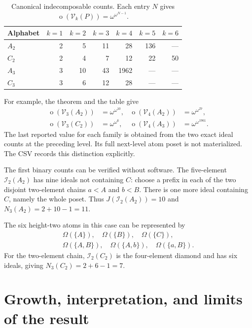 \documentclass[11pt,a4paper]{article}
\numberwithin{equation}{section}
\theoremstyle{definition}
\theoremstyle{remark}
\newcommand{\mot}{\mathop{o}}
\newcommand{\Vheight}{\mathcal V}
\newcommand{\I}{\mathcal I}
\begin{document}
\begin{table}[ht]
\centering
\renewcommand{\arraystretch}{1.2}
\begin{tabular}{@{}lrrrrrr@{}}
\toprule
Alphabet & $k=1$ & $k=2$ & $k=3$ & $k=4$ & $k=5$ & $k=6$\\
\midrule
$A_2$ & 2 & 5 & 11 & 28 & 136 & ---\\
$C_2$ & 2 & 4 & 7 & 12 & 22 & 50\\
$A_3$ & 3 & 10 & 43 & 1962 & --- & ---\\
$C_3$ & 3 & 6 & 12 & 28 & --- & ---\\
\bottomrule
\end{tabular}
\caption{Canonical indecomposable counts. Each entry $N$ gives
$\mot(\Vheight_k(P))=\omega^{\omega^{N-1}}$.}
\label{height:tab:counts}
\end{table}

For example, the theorem and the table give
\[
\begin{aligned}
  \mot(\Vheight_3(A_2))&=\omega^{\omega^{10}}, &
  \mot(\Vheight_4(A_2))&=\omega^{\omega^{27}},\\
  \mot(\Vheight_3(C_2))&=\omega^{\omega^6}, &
  \mot(\Vheight_4(A_3))&=\omega^{\omega^{1961}}.
\end{aligned}
\]
The last reported value for each family is obtained from the two exact
ideal counts at the preceding level. Its full next-level atom poset is
not materialized. The CSV records this distinction explicitly.

The first binary counts can be verified without software. The five-element
$\I_2(A_2)$ has nine ideals not containing $C$: choose a prefix in each of
the two disjoint two-element chains $a<A$ and $b<B$. There is one more
ideal containing $C$, namely the whole poset. Thus $J(\I_2(A_2))=10$
and $N_3(A_2)=2+10-1=11$.

The six height-two atoms in this case can be represented by
\[
\begin{gathered}
  \Omega(\{A\}),\quad \Omega(\{B\}),\quad \Omega(\{C\}),\\
  \Omega(\{A,B\}),\quad \Omega(\{A,b\}),\quad \Omega(\{a,B\}).
\end{gathered}
\]
For the two-element chain, $\I_2(C_2)$ is the four-element diamond and
has six ideals, giving $N_3(C_2)=2+6-1=7$.

\section{Growth, interpretation, and limits of the result}\label{height:sec:scope}
\end{document}
